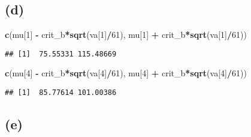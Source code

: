 \documentclass[
]{article}
\newenvironment{Shaded}{\begin{snugshade}}{\end{snugshade}}
\newcommand{\DecValTok}[1]{\textcolor[rgb]{0.00,0.00,0.81}{#1}}
\newcommand{\FunctionTok}[1]{\textcolor[rgb]{0.13,0.29,0.53}{\textbf{#1}}}
\newcommand{\NormalTok}[1]{#1}
\newcommand{\SpecialCharTok}[1]{\textcolor[rgb]{0.81,0.36,0.00}{\textbf{#1}}}
\begin{document}
\subsection{(d)}\label{d}

\begin{Shaded}
\begin{Highlighting}[]
\FunctionTok{c}\NormalTok{(mu[}\DecValTok{1}\NormalTok{] }\SpecialCharTok{{-}}\NormalTok{ crit\_b}\SpecialCharTok{*}\FunctionTok{sqrt}\NormalTok{(va[}\DecValTok{1}\NormalTok{]}\SpecialCharTok{/}\DecValTok{61}\NormalTok{), mu[}\DecValTok{1}\NormalTok{] }\SpecialCharTok{+}\NormalTok{ crit\_b}\SpecialCharTok{*}\FunctionTok{sqrt}\NormalTok{(va[}\DecValTok{1}\NormalTok{]}\SpecialCharTok{/}\DecValTok{61}\NormalTok{))}
\end{Highlighting}
\end{Shaded}

\begin{verbatim}
## [1]  75.55331 115.48669
\end{verbatim}

\begin{Shaded}
\begin{Highlighting}[]
\FunctionTok{c}\NormalTok{(mu[}\DecValTok{4}\NormalTok{] }\SpecialCharTok{{-}}\NormalTok{ crit\_b}\SpecialCharTok{*}\FunctionTok{sqrt}\NormalTok{(va[}\DecValTok{4}\NormalTok{]}\SpecialCharTok{/}\DecValTok{61}\NormalTok{), mu[}\DecValTok{4}\NormalTok{] }\SpecialCharTok{+}\NormalTok{ crit\_b}\SpecialCharTok{*}\FunctionTok{sqrt}\NormalTok{(va[}\DecValTok{4}\NormalTok{]}\SpecialCharTok{/}\DecValTok{61}\NormalTok{))}
\end{Highlighting}
\end{Shaded}

\begin{verbatim}
## [1]  85.77614 101.00386
\end{verbatim}

\subsection{(e)}\label{e}
\end{document}

